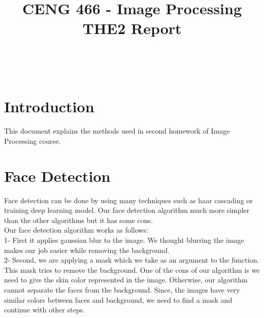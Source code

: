 \documentclass[conference]{IEEEtran}
\begin{document}
\title{CENG 466 - Image Processing THE2 Report} \\

\author{
\and
{}
}

\maketitle

\section{Introduction}
This document explains the methods used in second homework of Image Processing course.

\section{Face Detection}

Face detection can be done by using many techniques such as haar cascading or training deep learning model. Our face detection algorithm much more simpler than the other algorithms but it has some cons. \\

Our face detection algorithm works as follows: \\

1- First it applies gaussian blur to the image. We thought blurring the image makes our job easier while removing the background. \\

2- Second, we are applying a mask which we take as an argument to the function. This mask tries to remove the background. One of the cons of our algorithm is we need to give the skin color represented in the image. Otherwise, our algorithm cannot separate the faces from the background. Since, the images have very similar colors between faces and background, we need to find a mask and continue with other steps. \\
\end{document}
